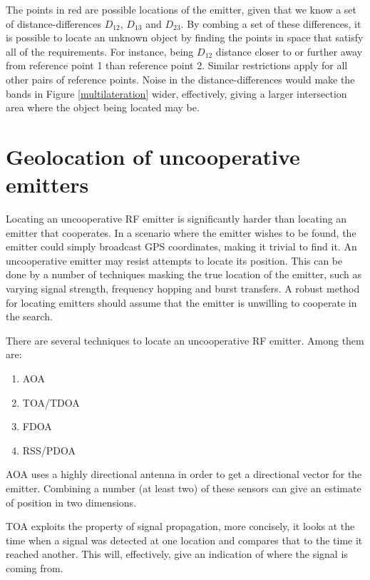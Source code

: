 \documentclass[10pt,a4paper]{book}
\begin{document}
The points in red are possible locations of the emitter, given that we know a set of distance-differences $D_{12}$, $D_{13}$ and $D_{23}$. By combing a set of these differences, it is possible to locate an unknown object by finding the points in space that satisfy all of the requirements. For instance, being $D_{12}$ distance closer to or further away from reference point 1 than reference point 2. Similar restrictions apply for all other pairs of reference points. Noise in the distance-differences would make the bands in Figure \ref{multilateration} wider, effectively, giving a larger intersection area where the object being located may be.

\newpage
\section{Geolocation of uncooperative emitters}
\label{GTFUE}

Locating an uncooperative \gls{RF} emitter is significantly harder than locating an emitter that cooperates. In a scenario where the emitter wishes to be found, the emitter could simply broadcast \gls{GPS} coordinates, making it trivial to find it. An uncooperative emitter may resist attempts to locate its position. This can be done by a number of techniques masking the true location of the emitter, such as varying signal strength, frequency hopping and burst transfers. A robust method for locating emitters should assume that the emitter is unwilling to cooperate in the search.

There are several techniques to locate an uncooperative \gls{RF} emitter. Among them are:

\begin{enumerate}
\item \acrfull{AOA} 
\item \acrfull{TOA}/\acrfull{TDOA}
\item \acrfull{FDOA}
\item \acrfull{RSS}/\acrfull{PDOA}
\end{enumerate}

\Gls{AOA} uses a highly directional antenna in order to get a directional vector for the emitter. Combining a number (at least two) of these sensors can give an estimate of position in two dimensions. 

\Gls{TOA} exploits the property of signal propagation, more concisely, it looks at the time when a signal was detected at one location and compares that to the time it reached another. This will, effectively, give an indication of where the signal is coming from.
\end{document}
